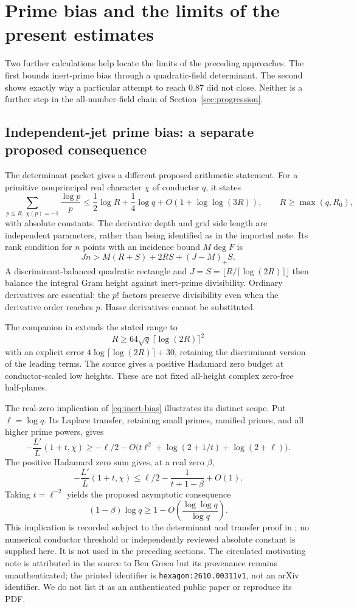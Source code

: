 \section{Prime bias and the limits of the present estimates}\label{sec:boundaries}

Two further calculations help locate the limits of the preceding approaches. The first bounds inert-prime bias through a quadratic-field determinant. The second shows exactly why a particular attempt to reach $0.87$ did not close. Neither is a further step in the all-number-field chain of Section~\ref{sec:progression}.

\subsection{Independent-jet prime bias: a separate proposed consequence}
The determinant packet \cite{R993} gives a different proposed arithmetic statement. For a primitive nonprincipal real character $\chi$ of conductor $q$, it states
\begin{equation}\label{eq:inert-bias}
 \sum_{p\le R,\ \chi(p)=-1}\frac{\log p}{p}
 \le\frac12\log R+\frac14\log q+O(1+\log\log(3R)),
 \qquad R\ge\max(q,R_0),
\end{equation}
with absolute constants. The derivative depth and grid side length are independent parameters, rather than being identified as in the imported note. Its rank condition for $n$ points with an incidence bound $M\deg F$ is
\[
 Jn>M(R+S)+2RS+(J-M)_+S.
\]
A discriminant-balanced quadratic rectangle and $J=S=\lfloor R/\lceil\log(2R)\rceil\rfloor$ then balance the integral Gram height against inert-prime divisibility. Ordinary derivatives are essential: the $p!$ factors preserve divisibility even when the derivative order reaches $p$. Hasse derivatives cannot be substituted.

The companion in \cite{R1000} extends the stated range to
\[
 R\ge64\sqrt q\,\lceil\log(2R)\rceil^2
\]
with an explicit error $4\log\lceil\log(2R)\rceil+30$, retaining the discriminant version of the leading terms. The source gives a positive Hadamard zero budget at conductor-scaled low heights. These are not fixed all-height complex zero-free half-planes.

The real-zero implication of \eqref{eq:inert-bias} illustrates its distinct scope. Put $\ell=\log q$. Its Laplace transfer, retaining small primes, ramified primes, and all higher prime powers, gives
\[
 -\frac{L'}L(1+t,\chi)
 \ge-\ell/2-O\bigl(t\ell^2+\log(2+1/t)+\log(2+\ell)\bigr).
\]
The positive Hadamard zero sum gives, at a real zero $\beta$,
\[
 -\frac{L'}L(1+t,\chi)\le\ell/2-\frac1{t+1-\beta}+O(1).
\]
Taking $t=\ell^{-2}$ yields the proposed asymptotic consequence
\[
 (1-\beta)\log q\ge1-O\left(\frac{\log\log q}{\log q}\right).
\]
This implication is recorded subject to the determinant and transfer proof in \cite{R993}; no numerical conductor threshold or independently reviewed absolute constant is supplied here. It is not used in the preceding sections. The circulated motivating note is attributed in the source to Ben Green but its provenance remains unauthenticated; the printed identifier is \texttt{hexagon:2610.00311v1}, not an arXiv identifier. We do not list it as an authenticated public paper or reproduce its PDF.

